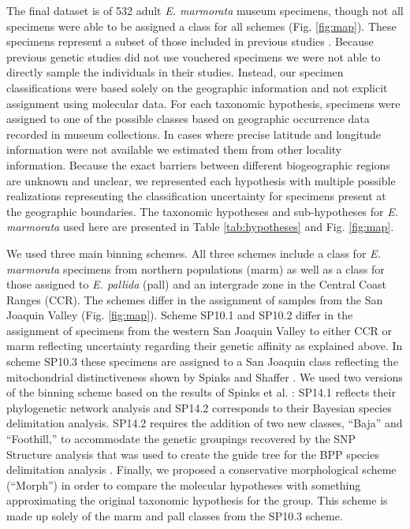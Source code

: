 \documentclass[10pt,letterpaper]{article}
\begin{document}
The final dataset is of 532 adult \textit{E. marmorata} museum specimens, though not all specimens were able to be assigned a class for all schemes (Fig. \ref{fig:map}). These specimens represent a subset of those included in previous studies \cite{Angielczyk2007,Angielczyk2011,Angielczyk2013a}. Because previous genetic studies did not use vouchered specimens \cite{Spinks2005,Spinks2010,Spinks2014} we were not able to directly sample the individuals in their studies. Instead, our specimen classifications were based solely on the geographic information and not explicit assignment using molecular data. For each taxonomic hypothesis, specimens were assigned to one of the possible classes based on geographic occurrence data recorded in museum collections. In cases where precise latitude and longitude information were not available we estimated them from other locality information. Because the exact barriers between different biogeographic regions are unknown and unclear, we represented each hypothesis with multiple possible realizations representing the classification uncertainty for specimens present at the geographic boundaries. The taxonomic hypotheses and sub-hypotheses for \textit{E. marmorata} used here are presented in Table \ref{tab:hypotheses} and Fig. \ref{fig:map}.

We used three main binning schemes. All three schemes include a class for \textit{E. marmorata} specimens from northern populations (marm) as well as a class for those assigned to \textit{E. pallida} (pall) and an intergrade zone in the Central Coast Ranges (CCR). The schemes differ in the assignment of samples from the San Joaquin Valley (Fig. \ref{fig:map}). Scheme SP10.1 and SP10.2 differ in the assignment of specimens from the western San Joaquin Valley to either CCR or marm reflecting uncertainty regarding their genetic affinity as explained above. In scheme SP10.3 these specimens are assigned to a San Joaquin class reflecting the mitochondrial distinctiveness shown by Spinks and Shaffer \cite{Spinks2005}. We used two versions of the binning scheme based on the results of Spinks et al. \cite{Spinks2014}: SP14.1 reflects their phylogenetic network analysis and SP14.2 corresponds to their Bayesian species delimitation analysis. SP14.2 requires the addition of two new classes, ``Baja'' and ``Foothill,'' to accommodate the genetic groupings recovered by the SNP Structure analysis that was used to create the guide tree for the BPP species delimitation analysis \cite{Spinks2014}. Finally, we proposed a conservative morphological scheme (``Morph'') in order to compare the molecular hypotheses with something approximating the original taxonomic hypothesis for the group. This scheme is made up solely of the marm and pall classes from the SP10.3 scheme.
\end{document}
